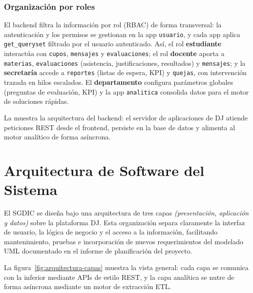 ﻿\subsection{Organización por roles}
\label{sec:backend-rol}

El backend filtra la información por rol (\ac{RBAC}) de forma transversal:
la autenticación y los permisos se gestionan en la app \texttt{usuario}, y
cada app aplica \texttt{get\_queryset} filtrado por el usuario autenticado.
Así, el rol \textbf{estudiante} interactúa con \texttt{cupos},
\texttt{mensajes} y \texttt{evaluaciones}; el rol \textbf{docente} aporta a
\texttt{materias}, \texttt{evaluaciones} (asistencia, justificaciones,
resultados) y \texttt{mensajes}; y la \textbf{secretaría} accede a
\texttt{reportes} (listas de espera, \ac{KPI}) y \texttt{quejas}, con
intervención trazada en hilos escalados. El \textbf{departamento}
configura parámetros globales (preguntas de evaluación, \ac{KPI}) y la app
\texttt{analitica} consolida datos para el motor de soluciones rápidas.

La  muestra la arquitectura del backend: el servidor
de aplicaciones de \ac{DJ} atiende peticiones \ac{REST} desde el frontend,
persiste en la base de datos y alimenta al motor analítico de forma
asíncrona.
﻿%

\chapter{Arquitectura de Software del Sistema}
\label{ch:arquitectura}

El \ac{SGDIC} se diseña bajo una arquitectura de tres capas
\textit{(presentación, aplicación y datos)} sobre la plataforma
\ac{DJ}. Esta organización separa claramente la interfaz de usuario, la
lógica de negocio y el acceso a la información, facilitando mantenimiento,
pruebas e incorporación de nuevos requerimientos del modelado \ac{UML}
documentado en el informe de planificación del proyecto.

La figura~\ref{fig:arquitectura-capas} muestra la vista general: cada capa
se comunica con la inferior mediante \ac{API}s de estilo \ac{REST}, y la
capa analítica se nutre de forma asíncrona mediante un motor de extracción
\ac{ETL}.

